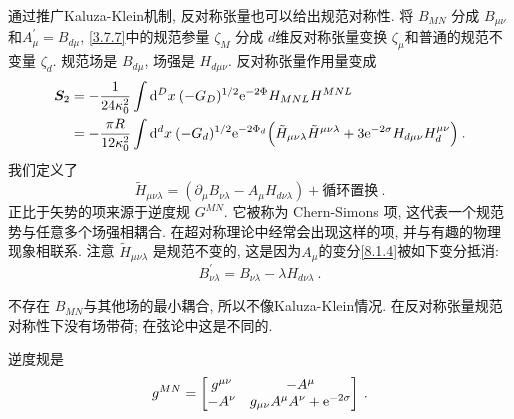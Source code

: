 


通过推广Kaluza-Klein机制, 反对称张量也可以给出规范对称性. 将 $B_{M N}$ 分成 $B_{\mu \nu}$和$A_{\mu}^{\prime}=B_{d \mu}$, 
\eqref{3.7.7}中的规范参量 $\zeta_{M}$ 分成 $d$维反对称张量变换 $\zeta_{\mu}$和普通的规范不变量 $\zeta_{d}$. 
规范场是 $B_{d \mu}$, 场强是 $H_{d \mu \nu}$. 反对称张量作用量变成
\begin{align}
	\bm{S}_{2} &=-\frac{1}{24 \kappa_{0}^{2}} \int \mathrm{d}^{D} x \:(-G_{D})^{1 / 2} \mathrm{e}^{-2 \Phi} H_{M N L} H^{M N L} \nonumber \\
	&=-\frac{\pi R}{12 \kappa_{0}^{2}} \int \mathrm{d}^{d} x \: (-G_{d})^{1/2} \mathrm{e}^{-2 \Phi_{d}}
	\Bigl(\tilde{H}_{\mu \nu \lambda} \tilde{H}^{\mu \nu \lambda}+3 \mathrm{e}^{-2 \sigma} H_{d \mu \nu} H_{d}^{\mu \nu}\Bigr) \:. \label{8.1.13}
\end{align}
我们定义了
\begin{equation}
	\tilde{H}_{\mu \nu \lambda}=(\partial_{\mu} B_{\nu \lambda}-A_{\mu} H_{d \nu \lambda})+\text{循环置换} \:. \label{8.1.14}
\end{equation}
正比于矢势的项来源于逆度规 $G^{M N} $. 它被称为 Chern-Simons 项, 这代表一个规范势与任意多个场强相耦合. 
在超对称理论中经常会出现这样的项, 并与有趣的物理现象相联系. 注意 $\tilde{H}_{\mu \nu \lambda}$ 是规范不变的, 
这是因为$A_{\mu}$的变分\eqref{8.1.4}被如下变分抵消: 
\begin{equation}
	B_{\nu \lambda}^{\prime}=B_{\nu \lambda}-\lambda H_{d \nu \lambda} \:. \label{8.1.15}
\end{equation}

不存在 $B_{M N}$与其他场的最小耦合, 所以不像Kaluza-Klein情况. 在反对称张量规范对称性下没有场带荷; 在弦论中这是不同的.
\begin{tcolorbox}
	\begin{remark}
		逆度规是
		\[
		g^{MN}=\begin{bmatrix}
			g^{\mu \nu} & -A^{\mu} \\
            -A^{\nu} & g_{\mu \nu} A^{\mu} A^{\nu}+\mathrm{e}^{-2 \sigma}
		\end{bmatrix}	 \:.
		\]
	\end{remark}
\end{tcolorbox}


